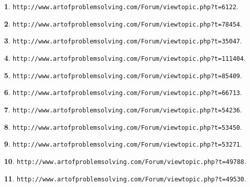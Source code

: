 \documentclass{article}
\theoremstyle{definition}
\newtheorem{s}{}
\begin{document}
\begin{s}
\texttt{http://www.artofproblemsolving.com/Forum/viewtopic.php?t=6122}.
\end{s}




\begin{s}
\texttt{http://www.artofproblemsolving.com/Forum/viewtopic.php?t=78454}.
\end{s}




\begin{s}
\texttt{http://www.artofproblemsolving.com/Forum/viewtopic.php?t=35047}.
\end{s}

\begin{s}
\texttt{http://www.artofproblemsolving.com/Forum/viewtopic.php?t=111404}.
\end{s}




\begin{s}
\texttt{http://www.artofproblemsolving.com/Forum/viewtopic.php?t=85409}.
\end{s}




\begin{s}
\texttt{http://www.artofproblemsolving.com/Forum/viewtopic.php?t=66713}.
\end{s}




\begin{s}
\texttt{http://www.artofproblemsolving.com/Forum/viewtopic.php?t=54236}.
\end{s}




\begin{s}
\texttt{http://www.artofproblemsolving.com/Forum/viewtopic.php?t=53450}.
\end{s}




\begin{s}
\texttt{http://www.artofproblemsolving.com/Forum/viewtopic.php?t=53271}.
\end{s}




\begin{s}
\texttt{http://www.artofproblemsolving.com/Forum/viewtopic.php?t=49788}.
\end{s}




\begin{s}
\texttt{http://www.artofproblemsolving.com/Forum/viewtopic.php?t=49530}.
\end{s}
\end{document}
